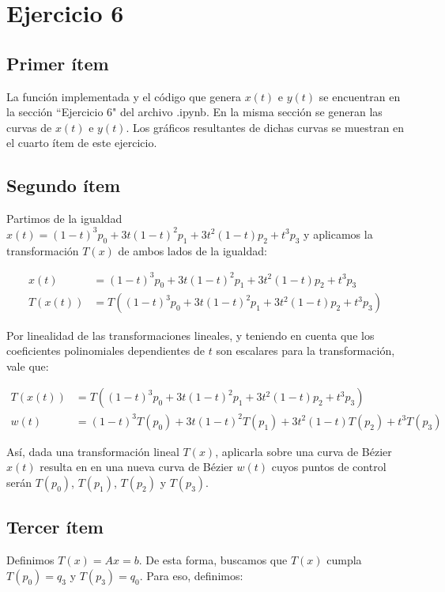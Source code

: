 \documentclass{article}
\begin{document}
\section*{Ejercicio 6}
\subsection*{Primer ítem}
La función implementada y el código que genera $x(t)$ e $y(t)$ se encuentran en la sección ``Ejercicio 6" del archivo .ipynb. En la misma sección se generan las curvas de $x(t)$ e $y(t)$. Los gráficos resultantes de dichas curvas se muestran en el cuarto ítem de este ejercicio.

\subsection*{Segundo ítem}
Partimos de la igualdad $x(t) = (1 - t)^3 p_0 + 3t(1 - t)^2 p_1 + 3t^2(1 - t) p_2 + t^3 p_3$ y aplicamos la transformación $T(x)$ de ambos lados de la igualdad:

$$
\begin{aligned}
x(t) &= (1 - t)^3 p_0 + 3t(1 - t)^2 p_1 + 3t^2(1 - t) p_2 + t^3 p_3 \\
T(x(t)) &= T((1 - t)^3 p_0 + 3t(1 - t)^2 p_1 + 3t^2(1 - t) p_2 + t^3 p_3)
\end{aligned}
$$

Por linealidad de las transformaciones lineales, y teniendo en cuenta que los coeficientes polinomiales dependientes de $t$ son escalares para la transformación, vale que:

$$
\begin{aligned}
T(x(t)) &= T((1 - t)^3 p_0 + 3t(1 - t)^2 p_1 + 3t^2(1 - t) p_2 + t^3 p_3) \\
w(t) &= (1 - t)^3 T(p_0) + 3t(1 - t)^2 T(p_1) + 3t^2(1 - t) T(p_2) + t^3 T(p_3)
\end{aligned}
$$

Así, dada una transformación lineal $T(x)$, aplicarla sobre una curva de Bézier $x(t)$ resulta en en una nueva curva de Bézier $w(t)$ cuyos puntos de control serán  $T(p_0)$,  $T(p_1)$,  $T(p_2)$ y  $T(p_3)$.

\subsection*{Tercer ítem}
Definimos $T(x) = Ax = b$. De esta forma, buscamos que $T(x)$ cumpla $T(p_0) = q_3$ y $T(p_3) = q_0$. 
Para eso, definimos: 
\end{document}
